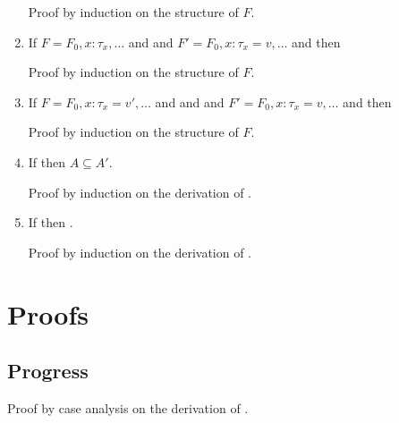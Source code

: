 \begin{enumerate}
  Proof by induction on the structure of $F$.

\item \label{assignfirstframetype}
  If $F = F_0,x:\tau_x,\ldots$ and  and $F' = F_0,x:\tau_x=v,\ldots$ and 
  then 

  Proof by induction on the structure of $F$.

\item \label{assignframetype}
  If $F = F_0,x:\tau_x=v',\ldots$ and  and  and $F' = F_0,x:\tau_x=v,\ldots$ and 
  then 

  Proof by induction on the structure of $F$.

\item \label{assignexpand}
  If  then $A \subseteq A'$.

  Proof by induction on the derivation of .

\item \label{loopsub}
  If  then .

  Proof by induction on the derivation of .

\end{enumerate}

\section{Proofs}

\subsection{Progress}
\label{progressproof}

Proof by case analysis on the derivation of .

\newcommand{\progressruleused}[2]{Case \rulefmt{#1} was used so #2}

